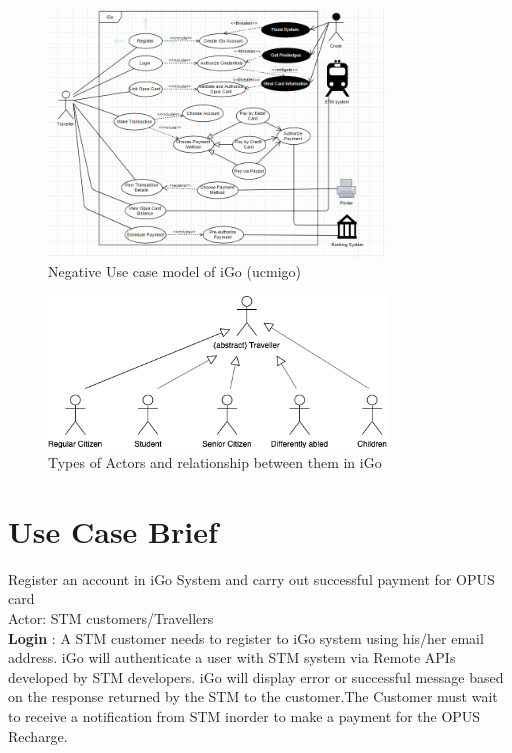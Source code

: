 \documentclass[11pt, english]{report}
\begin{document}
\begin{figure}[H]
  
  \includegraphics[width=0.8\textwidth]{images/negativeusecase.png}
  \centering
  \caption{ Negative Use case model of iGo (\gls{ucmigo})}

\end{figure}

 \begin{figure}[H]
  
  \includegraphics[width=0.8\textwidth]{images/actor_relationship.png}
  \centering
  \caption{Types of Actors and relationship between them in iGo}

\end{figure}



\section{Use Case Brief}

Register an account in iGo System and carry out successful payment for OPUS card\\
Actor: STM customers/Travellers\\

\textbf{Login} : A STM customer needs to register to iGo system using his/her email address. iGo will authenticate a user with STM system via Remote APIs developed by STM developers. iGo will display error or successful message based on the response returned by the STM to the customer.The Customer must wait to receive a notification from STM inorder to make a payment for the OPUS Recharge.\\ 
\end{document}
